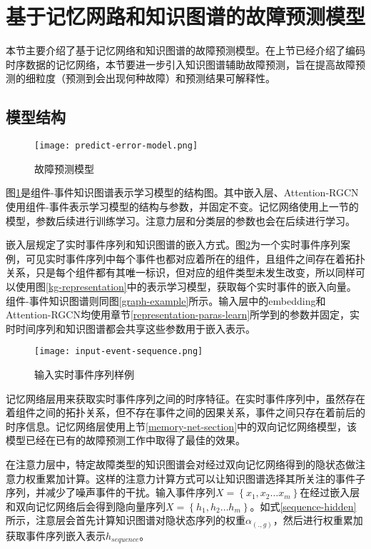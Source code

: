 \section{基于记忆网路和知识图谱的故障预测模型}
本节主要介绍了基于记忆网络和知识图谱的故障预测模型。在上节已经介绍了编码时序数据的记忆网络，本节要进一步引入知识图谱辅助故障预测，旨在提高故障预测的细粒度（预测到会出现何种故障）和预测结果可解释性。

\subsection{模型结构}
\begin{figure}[htbp]
    \centering
    \texttt{[image: predict-error-model.png]}
    \caption{故障预测模型\label{predict-error-model}}
\end{figure}
图\ref{predict-error-model}是组件-事件知识图谱表示学习模型的结构图。其中嵌入层、Attention-RGCN使用组件-事件表示学习模型的结构与参数，并固定不变。记忆网络使用上一节的模型，参数后续进行训练学习。注意力层和分类层的参数也会在后续进行学习。

嵌入层规定了实时事件序列和知识图谱的嵌入方式。图\ref{input-event-sequence}为一个实时事件序列案例，可见实时事件序列中每个事件也都对应着所在的组件，且组件之间存在着拓扑关系，只是每个组件都有其唯一标识，但对应的组件类型未发生改变，所以同样可以使用图\ref{kg-representation}中的表示学习模型，获取每个实时事件的嵌入向量。组件-事件知识图谱则同图\ref{graph-example}所示。输入层中的embedding和Attention-RGCN均使用章节\ref{representation-paras-learn}所学到的参数并固定，实时时间序列和知识图谱都会共享这些参数用于嵌入表示。
\begin{figure}[htbp]
    \centering
    \texttt{[image: input-event-sequence.png]}
    \caption{输入实时事件序列样例\label{input-event-sequence}}
\end{figure}

记忆网络层用来获取实时事件序列之间的时序特征。在实时事件序列中，虽然存在着组件之间的拓扑关系，但不存在事件之间的因果关系，事件之间只存在着前后的时序信息。记忆网络层使用上节\ref{memory-net-section}中的双向记忆网络模型，该模型已经在已有的故障预测工作中取得了最佳的效果。

在注意力层中，特定故障类型的知识图谱会对经过双向记忆网络得到的隐状态做注意力权重累加计算。这样的注意力计算方式可以让知识图谱选择其所关注的事件子序列，并减少了噪声事件的干扰。输入事件序列$X=\left\{x_{1}, x_{2} \ldots x_{m}\right\}$在经过嵌入层和双向记忆网络后会得到隐向量序列$X=\left\{h_{1}, h_{2} \ldots h_{m}\right\}$。如式\ref{sequence-hidden}所示，注意层会首先计算知识图谱对隐状态序列的权重$\alpha_{(. , g)}$，然后进行权重累加获取事件序列嵌入表示$h_{sequence}$。

